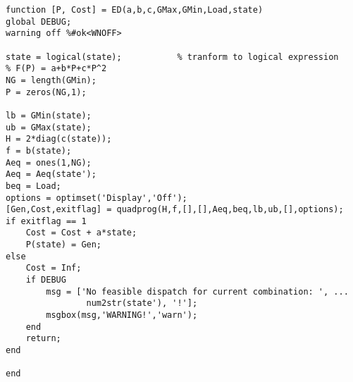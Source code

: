 \begin{verbatim}
function [P, Cost] = ED(a,b,c,GMax,GMin,Load,state)
global DEBUG;
warning off %#ok<WNOFF>

state = logical(state);           % tranform to logical expression
% F(P) = a+b*P+c*P^2
NG = length(GMin);
P = zeros(NG,1);

lb = GMin(state);
ub = GMax(state);
H = 2*diag(c(state));
f = b(state);
Aeq = ones(1,NG);
Aeq = Aeq(state');
beq = Load;
options = optimset('Display','Off');
[Gen,Cost,exitflag] = quadprog(H,f,[],[],Aeq,beq,lb,ub,[],options);
if exitflag == 1
    Cost = Cost + a*state;
    P(state) = Gen;
else
    Cost = Inf;
    if DEBUG
        msg = ['No feasible dispatch for current combination: ', ...
                num2str(state'), '!'];
        msgbox(msg,'WARNING!','warn');
    end
    return;
end

end
\end{verbatim}

